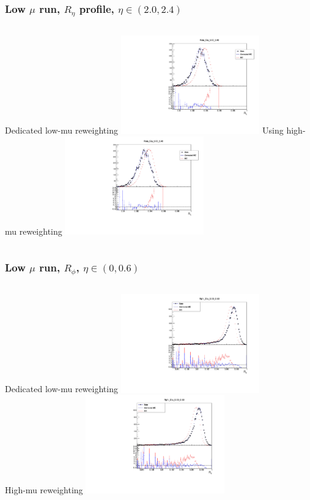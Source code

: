 \documentclass{beamer}
\begin{document}

\begin{frame}
\frametitle{Low $\mu$ run, $R_{\eta}$ profile, $\eta \in (2.0,2.4)$}

\begin{columns}[t]

\centering
\normalsize{Dedicated low-mu reweighting}
\includegraphics[width=6cm]{Reta_Rew_Eta_20_24_lowmu_13TeV_LocalWB.pdf}
\centering
\normalsize{Using high-mu reweighting}
\includegraphics[width=6cm]{Reta_Eta_20_24_lowmu_13TeV_AthenaWB.pdf}
\end{columns}
\end{frame}
\begin{frame}
\frametitle{Low $\mu$ run, $R_{\phi}$, $\eta \in (0,0.6)$}

\begin{columns}[t]

\centering
\normalsize{Dedicated low-mu reweighting}
\includegraphics[width=6cm]{Rphi_Rew_Eta_0_6_lowmu_13TeV_LocalWB.pdf}\\
\centering
\normalsize{High-mu reweighting}
\includegraphics[width=6cm]{Rphi_Eta_0_6_lowmu_13TeV_AthenaWB.pdf}\\
\end{columns}
\end{frame}
\end{document}
